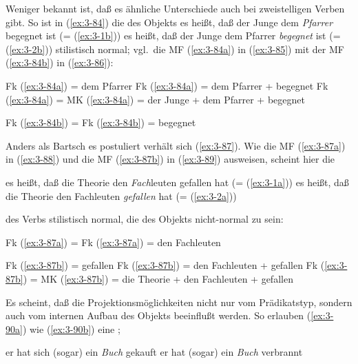 \documentclass[output=paper]{langsci/langscibook}
\begin{document}
\addlines
Weniger bekannt ist, daß es ähnliche Unterschiede auch bei
zweistelligen Verben gibt. So ist in (\ref{ex:3-84}) die  des Objekts
\eal
\label{ex:3-84}
\ex
\label{ex:3-84a}
es heißt, daß der Junge dem \textit{Pfarrer} begegnet ist (= (\ref{ex:3-1b}))
\ex
\label{ex:3-84b}
es heißt, daß der Junge dem Pfarrer \textit{begegnet} ist (= (\ref{ex:3-2b}))
\zl
stilistisch normal; vgl.\ die MF (\ref{ex:3-84a}) in (\ref{ex:3-85}) mit der MF (\ref{ex:3-84b}) in (\ref{ex:3-86}):
\begin{exe}
\ex
\label{ex:3-85}
\begin{xlist}
\ex
\label{ex:3-85a}
Fk (\ref{ex:3-84a}) = dem Pfarrer
\ex
\label{ex:3-85b}
Fk (\ref{ex:3-84a}) = dem Pfarrer + begegnet
\ex
\label{ex:3-85c}
Fk (\ref{ex:3-84a}) = MK (\ref{ex:3-84a}) = der Junge + dem Pfarrer + begegnet
\end{xlist}
\ex
\label{ex:3-86}
Fk (\ref{ex:3-84b}) = Fk (\ref{ex:3-84b}) = begegnet
\end{exe}
Anders als Bartsch es postuliert verhält sich (\ref{ex:3-87}). Wie die MF (\ref{ex:3-87a}) in (\ref{ex:3-88}) und die MF (\ref{ex:3-87b}) in (\ref{ex:3-89}) ausweisen, scheint hier die 
\begin{exe}
\ex
\label{ex:3-87}
\begin{xlist}
\ex
\label{ex:3-87a}
es heißt, daß die Theorie den \textit{Fach}leuten gefallen hat (= (\ref{ex:3-1a}))
\ex
\label{ex:3-87b}
es heißt, daß die Theorie den Fachleuten \textit{gefallen} hat (= (\ref{ex:3-2a}))
\end{xlist}
\end{exe}
des Verbs stilistisch normal, die des Objekts nicht-normal zu sein:
\begin{exe}
\ex
\label{ex:3-88}
Fk (\ref{ex:3-87a}) = Fk (\ref{ex:3-87a}) = den Fachleuten
\ex
\label{ex:3-89}
\begin{xlist}
\ex
\label{ex:3-89a}
Fk (\ref{ex:3-87b}) = gefallen
\ex
\label{ex:3-89b}
Fk (\ref{ex:3-87b}) = den Fachleuten + gefallen
\ex
\label{ex:3-89c}
Fk (\ref{ex:3-87b}) = MK (\ref{ex:3-87b}) = die Theorie + den Fachleuten + gefallen
\end{xlist}
\end{exe}
Es scheint, daß die Projektionsmöglichkeiten nicht nur vom
Prädikatstyp, sondern auch vom internen Aufbau des Objekts beeinflußt
werden. So erlauben (\ref{ex:3-90a}) wie (\ref{ex:3-90b}) eine ;
\begin{exe}
\ex
\label{ex:3-90}
\begin{xlist}
\ex
\label{ex:3-90a}
er hat sich (sogar) ein \textit{Buch} gekauft
\ex
\label{ex:3-90b}
er hat (sogar) ein \textit{Buch} verbrannt
\end{xlist}
\end{exe}
\end{document}
